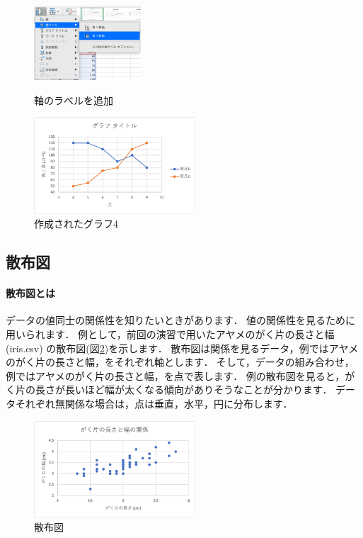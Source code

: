 \begin{figure}[tb]
    \begin{minipage}{0.5\hsize}
        \centering
        \includegraphics[width=4cm]{chap2/line_label.png}
        \caption{軸のラベルを追加}
        \label{fig:line_range}
    \end{minipage}
    \begin{minipage}{0.5\hsize}
        \centering
        \includegraphics[width=6cm]{chap2/line4.png}
        \caption{作成されたグラフ4}
        \label{fig:line3}
    \end{minipage}
\end{figure}

\subsection{散布図}

\paragraph{散布図とは}

データの値同士の関係性を知りたいときがあります．
値の関係性を見るために用いられます．
例として，前回の演習で用いたアヤメのがく片の長さと幅 (iris.csv) の散布図(図\ref{fig:scatter})を示します．
散布図は関係を見るデータ，例ではアヤメのがく片の長さと幅，をそれぞれ軸とします．
そして，データの組み合わせ，例ではアヤメのがく片の長さと幅，を点で表します．
例の散布図を見ると，がく片の長さが長いほど幅が太くなる傾向がありそうなことが分かります．
データそれぞれ無関係な場合は，点は垂直，水平，円に分布します．

\begin{figure}[htbp]
    \centering
    \includegraphics[width=6cm]{chap2/scatter.png}
    \caption{散布図}
    \label{fig:scatter}
\end{figure}

